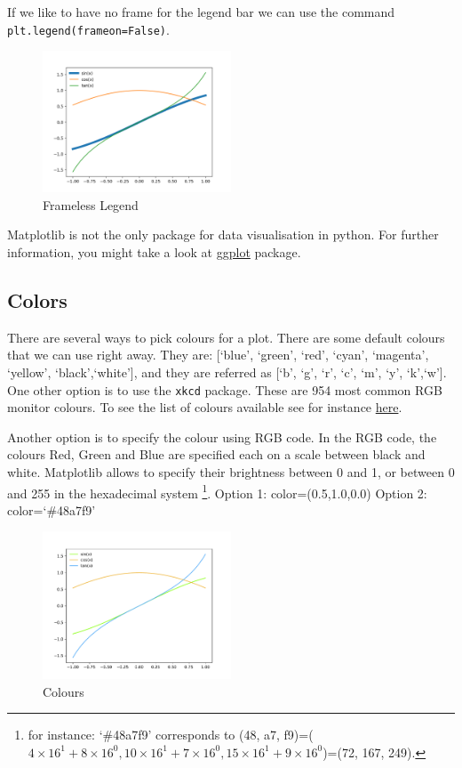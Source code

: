 \documentclass[10pt,a4paper]{article}
\newcommand{\te}{\texttt}
\begin{document}
If we like to have no frame for the legend bar we can use the command \te{plt.legend(frameon=False)}.

\begin{figure}[htbp]\centering
\caption{Frameless Legend}
\includegraphics[width=0.5\textwidth]{legendframeless.png}
\end{figure}

Matplotlib is not the only package for data visualisation in python. For further information, you might take a look at \href{http://ggplot.yhathq.com/how-it-works.html}{ggplot} package.


\subsection{Colors}
There are several ways to pick colours for a plot. There are some default colours that we can use right away. They are: [`blue', `green', `red', `cyan', `magenta', `yellow', `black',`white'], and they are referred as  [`b', `g', `r', `c', `m', `y', `k',`w']. One other option is to use the \te{xkcd} package. These are 954 most common RGB monitor colours. To see the list of colours available see for instance \href{https://xkcd.com/color/rgb/}{here}. 

Another option is to specify the colour using RGB code. In the RGB code, the colours Red, Green and Blue are specified each on a scale between black and white. Matplotlib allows to specify their brightness between 0 and 1, or between 0 and 255 in the hexadecimal system \footnote{for instance: `\#48a7f9' corresponds to (48, a7, f9)=($4\times 16^1+8\times 16^0, 10\times 16^1+7\times 16^0, 15\times 16^1+9\times 16^0$)=(72, 167, 249). }.
Option 1: color=(0.5,1.0,0.0)
Option 2: color=`\#48a7f9'

\begin{figure}[htbp]\centering
\caption{Colours}
\includegraphics[width=0.5\textwidth]{all_colour.pdf}
\end{figure}
\end{document}
